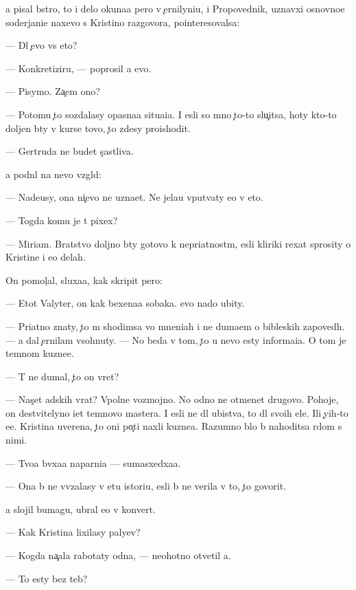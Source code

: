 \documentclass[10pt]{book}
\begin{document}
{\Y}a pisal b{\yi}stro, to i delo okuna{\y}a pero v {\c}ernilyni{\q}u, i Propovednik, uznavxi{\y} osnovno{\y}e soderjani{\y}e naxevo s Kristino{\y} razgovora, pointeresovalsa:

— Dl{\ia} {\c}evo vs{\e} eto?

— Konkretiziru{\y}, — poprosil {\y}a {\y}evo.

— Pisymo. Za{\c}em ono?

— Potomu {\c}to sozdalasy opasna{\y}a situa{\q}i{\y}a. I {\y}esli so mno{\y} {\c}to-to slu{\c}itsa, hoty kto-to doljen b{\yi}ty v kurse tovo, {\c}to zdesy proishodit.

— Gertruda ne budet s{\c}astliva.

{\Y}a podn{\ia}l na nevo vzgl{\ia}d:

— Nade{\y}usy, ona ni{\c}evo ne uzna{\y}et. Ne jela{\y}u vput{\yi}vaty {\y}e{\y}o v eto.

— Togda komu je t{\yi} pixex?

— Miriam. Bratstvo doljno b{\yi}ty gotovo k nepri{\y}atnost{\ia}m, {\y}esli kliriki rexat sprosity o Kristine i {\y}e{\y}o delah.

On pomol{\c}al, sluxa{\y}a, kak skripit pero:

— Etot Valyter, on kak bexena{\y}a sobaka. {\Y}evo nado ubity.

— Pri{\y}atno znaty, {\c}to m{\yi} shodimsa vo mneni{\y}ah i ne duma{\y}em o bible{\y}skih zapoved{\ia}h. — {\Y}a dal {\c}ernilam v{\yi}sohnuty. — No beda v tom, {\c}to u nevo {\y}esty informa{\q}i{\y}a. O tom je temnom kuzne{\q}e.

— T{\yi} ne dumal, {\c}to on vret?

— Nas{\c}et adskih vrat? Vpolne vozmojno. No odno ne otmen{\ia}{\y}et drugovo. Pohoje, on de{\y}stvitelyno i{\x}et temnovo mastera. I {\y}esli ne dl{\ia} ubi{\y}stva, to dl{\ia} svo{\y}ih {\q}ele{\y}. Ili {\c}yih-to {\y}e{\x}e. Kristina uverena, {\c}to oni po{\c}ti naxli kuzne{\q}a. Razumno b{\yi}lo b{\yi} nahoditsa r{\ia}dom s nimi.

— Tvo{\y}a b{\yi}vxa{\y}a naparni{\q}a — sumasxedxa{\y}a.

— Ona b{\yi} ne vv{\ia}zalasy v etu istori{\y}u, {\y}esli b{\yi} ne verila v to, {\c}to govorit.

{\Y}a slojil bumagu, ubral {\y}e{\y}o v konvert.

— Kak Kristina lixilasy paly{\q}ev?

— Kogda na{\c}ala rabotaty odna, — neohotno otvetil {\y}a.

— To {\y}esty bez teb{\ia}?
\end{document}
